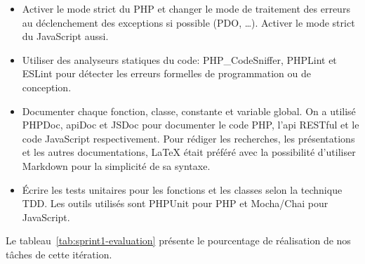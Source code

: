 \begin{itemize}
    \item Activer le mode strict du PHP et changer le mode de traitement des
        erreurs au déclenchement des exceptions si possible (PDO, \ldots).
        Activer le mode strict du JavaScript aussi.
    \item Utiliser des analyseurs statiques du code: PHP\_CodeSniffer, PHPLint
        et ESLint pour détecter les erreurs formelles de programmation ou de
        conception.
    \item Documenter chaque fonction, classe, constante et variable global. On
        a utilisé PHPDoc, apiDoc et JSDoc pour documenter le code PHP, l'api
        RESTful et le code JavaScript respectivement. Pour rédiger les
        recherches, les présentations et les autres documentations, \LaTeX{}
        était préféré avec la possibilité d'utiliser Markdown pour la
        simplicité de sa syntaxe.
    \item Écrire les tests unitaires pour les fonctions et les classes selon la
        technique \acrshort{TDD}. Les outils utilisés sont PHPUnit pour
        PHP et Mocha/Chai pour JavaScript.
\end{itemize}

Le tableau~\ref{tab:sprint1-evaluation} présente le pourcentage de réalisation
de nos tâches de cette itération.

